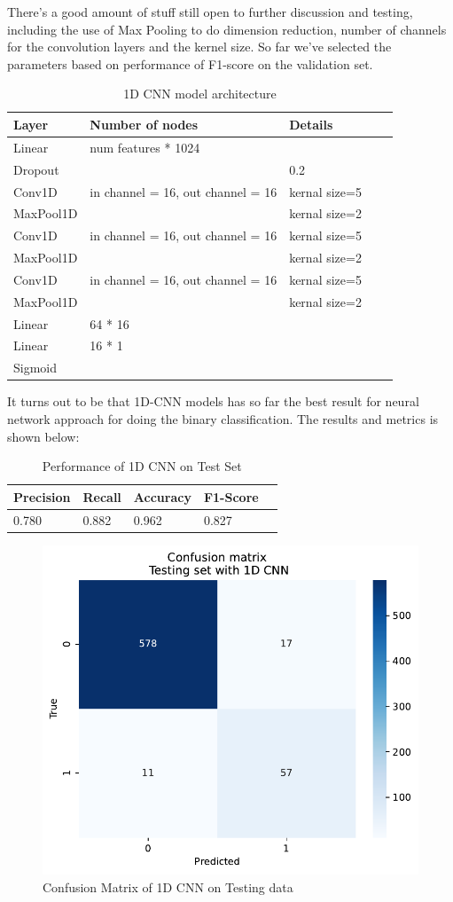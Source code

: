 \documentclass[10pt,letterpaper]{article}
\begin{document}
There's a good amount of stuff still open to further discussion and testing, including the use of 
Max Pooling to do dimension reduction, number of channels for the convolution layers and the kernel size. 
So far we've selected the parameters based on performance of F1-score on the validation set.
\begin{table}[H]
\centering
\footnotesize
\begin{tabular}{lllll}
\toprule
\textbf{Layer} & \textbf{Number of nodes} & \textbf{Details} \\
\midrule
Linear & num features * 1024 & \\
Dropout & & 0.2 \\
Conv1D & in channel = 16, out channel = 16 & kernal size=5\\
MaxPool1D &  & kernal size=2\\
Conv1D & in channel = 16, out channel = 16 & kernal size=5\\
MaxPool1D & & kernal size=2\\
Conv1D & in channel = 16, out channel = 16 & kernal size=5\\
MaxPool1D & & kernal size=2\\
Linear & 64 * 16 & \\
Linear & 16 * 1 & \\
Sigmoid & & \\
\bottomrule
\end{tabular}
\caption{1D CNN model architecture}
\end{table}
It turns out to be that 1D-CNN models has so far the best result for neural network approach for doing the binary classification. The results and metrics is shown below:

\begin{table}[H]
\centering
\footnotesize
\begin{tabular}{lllll}
\toprule
\textbf{Precision} & \textbf{Recall} & \textbf{Accuracy} &  \textbf{F1-Score}\\
\midrule
0.780 & 0.882 & 0.962 & 0.827  \\
\bottomrule
\end{tabular}
\caption{Performance of 1D CNN on Test Set}%
\end{table}

\begin{figure}[H]
    \centering
    \includegraphics[width=0.5\linewidth]{plots/1dcnn_confusion_matrix.pdf}
    \caption{Confusion Matrix of 1D CNN on Testing data}
    \label{fig:confusion-matrix-1dcnn}
\end{figure}
\end{document}
